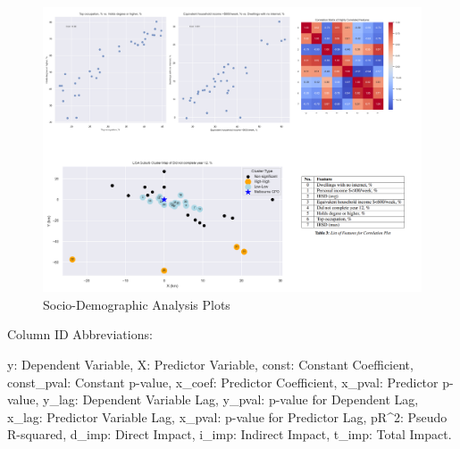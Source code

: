 \documentclass[
	a4paper, %
	10pt, %
	unnumberedsections, %
	twoside, %
]{LTJournalArticle}
\begin{document}
\pagebreak
\clearpage

\begin{figure}
  \centering
  \includegraphics[scale=0.45]{socio_demo_comb.png}
  \caption{Socio-Demographic Analysis Plots}
  \label{fig:socio_demo_fig}
\end{figure}



\begin{small}
  Column ID Abbreviations:
  
  y: Dependent Variable, X: Predictor Variable, const: Constant Coefficient, const\_pval: Constant p-value, x\_coef: Predictor Coefficient, x\_pval: Predictor p-value, y\_lag: Dependent Variable Lag, y\_pval: p-value for Dependent Lag, x\_lag: Predictor Variable Lag, x\_pval: p-value for Predictor Lag, pR\^{}2: Pseudo R-squared, d\_imp: Direct Impact, i\_imp: Indirect Impact, t\_imp: Total Impact.
\end{small}





  

\twocolumn
\printbibliography
\end{document}
